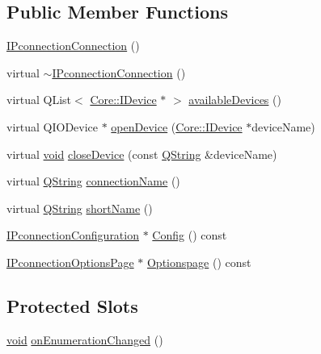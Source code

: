 \subsection*{\-Public \-Member \-Functions}
\begin{DoxyCompactItemize}
\item 
\hyperlink{group___i_p_conn_plugin_ga5eedabe97b32eaee1617cc040476a4b9}{\-I\-Pconnection\-Connection} ()
\item 
virtual \hyperlink{group___i_p_conn_plugin_ga003fc5feae8a88f8a1ad994b5b688f6e}{$\sim$\-I\-Pconnection\-Connection} ()
\item 
virtual \-Q\-List$<$ \hyperlink{class_core_1_1_i_device}{\-Core\-::\-I\-Device} $\ast$ $>$ \hyperlink{group___i_p_conn_plugin_ga046ba69036aa4661e97da3c8fbb13850}{available\-Devices} ()
\item 
virtual \-Q\-I\-O\-Device $\ast$ \hyperlink{group___i_p_conn_plugin_ga111b86b5f5905dee93d220a847614bed}{open\-Device} (\hyperlink{class_core_1_1_i_device}{\-Core\-::\-I\-Device} $\ast$device\-Name)
\item 
virtual \hyperlink{group___u_a_v_objects_plugin_ga444cf2ff3f0ecbe028adce838d373f5c}{void} \hyperlink{group___i_p_conn_plugin_gab576cdaa8af931b52cafea033a9c7350}{close\-Device} (const \hyperlink{group___u_a_v_objects_plugin_gab9d252f49c333c94a72f97ce3105a32d}{\-Q\-String} \&device\-Name)
\item 
virtual \hyperlink{group___u_a_v_objects_plugin_gab9d252f49c333c94a72f97ce3105a32d}{\-Q\-String} \hyperlink{group___i_p_conn_plugin_ga8709e871725c0d119edddd54db4c505c}{connection\-Name} ()
\item 
virtual \hyperlink{group___u_a_v_objects_plugin_gab9d252f49c333c94a72f97ce3105a32d}{\-Q\-String} \hyperlink{group___i_p_conn_plugin_gae18fe74813c61e299c3492ea3ac616c5}{short\-Name} ()
\item 
\hyperlink{class_i_pconnection_configuration}{\-I\-Pconnection\-Configuration} $\ast$ \hyperlink{group___i_p_conn_plugin_ga0e41970926f79a5f86cd89fe61075e03}{\-Config} () const 
\item 
\hyperlink{class_i_pconnection_options_page}{\-I\-Pconnection\-Options\-Page} $\ast$ \hyperlink{group___i_p_conn_plugin_ga8d119fd704cfcdca9ae8dc6c3a3c237b}{\-Optionspage} () const 
\end{DoxyCompactItemize}
\subsection*{\-Protected \-Slots}
\begin{DoxyCompactItemize}
\item 
\hyperlink{group___u_a_v_objects_plugin_ga444cf2ff3f0ecbe028adce838d373f5c}{void} \hyperlink{group___i_p_conn_plugin_ga1163b3efc22084c70e47aa84ac84c612}{on\-Enumeration\-Changed} ()
\end{DoxyCompactItemize}


